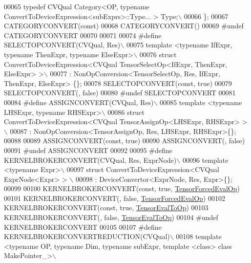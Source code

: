 \begin{DoxyCode}
00065 \textcolor{preprocessor}{  typedef CVQual Category<OP, typename ConvertToDeviceExpression<subExprs>::Type... > Type;\(\backslash\)}
00066 \textcolor{preprocessor}{\};}
00067 CATEGORYCONVERT(\textcolor{keyword}{const})
00068 CATEGORYCONVERT()
00069 \textcolor{preprocessor}{#undef CATEGORYCONVERT}
00070 
00071 
00074 \textcolor{preprocessor}{#define SELECTOPCONVERT(CVQual, Res)\(\backslash\)}
00075 \textcolor{preprocessor}{template <typename IfExpr, typename ThenExpr, typename ElseExpr>\(\backslash\)}
00076 \textcolor{preprocessor}{struct ConvertToDeviceExpression<CVQual TensorSelectOp<IfExpr, ThenExpr, ElseExpr> >\(\backslash\)}
00077 \textcolor{preprocessor}{: NonOpConversion<TensorSelectOp, Res, IfExpr, ThenExpr, ElseExpr> \{\};}
00078 SELECTOPCONVERT(\textcolor{keyword}{const}, \textcolor{keyword}{true})
00079 SELECTOPCONVERT(, \textcolor{keyword}{false})
00080 \textcolor{preprocessor}{#undef SELECTOPCONVERT}
00081 
00084 \textcolor{preprocessor}{#define ASSIGNCONVERT(CVQual, Res)\(\backslash\)}
00085 \textcolor{preprocessor}{template <typename LHSExpr, typename RHSExpr>\(\backslash\)}
00086 \textcolor{preprocessor}{struct ConvertToDeviceExpression<CVQual TensorAssignOp<LHSExpr, RHSExpr> >\(\backslash\)}
00087 \textcolor{preprocessor}{: NonOpConversion<TensorAssignOp, Res, LHSExpr, RHSExpr>\{\};}
00088 
00089 ASSIGNCONVERT(\textcolor{keyword}{const}, \textcolor{keyword}{true})
00090 ASSIGNCONVERT(, \textcolor{keyword}{false})
00091 \textcolor{preprocessor}{#undef ASSIGNCONVERT}
00092 
00095 \textcolor{preprocessor}{#define KERNELBROKERCONVERT(CVQual, Res, ExprNode)\(\backslash\)}
00096 \textcolor{preprocessor}{template <typename Expr>\(\backslash\)}
00097 \textcolor{preprocessor}{struct ConvertToDeviceExpression<CVQual ExprNode<Expr> > \(\backslash\)}
00098 \textcolor{preprocessor}{: DeviceConvertor<ExprNode, Res, Expr>\{\};}
00099 
00100 KERNELBROKERCONVERT(\textcolor{keyword}{const}, \textcolor{keyword}{true}, \hyperlink{class_eigen_1_1_tensor_forced_eval_op}{TensorForcedEvalOp})
00101 KERNELBROKERCONVERT(, \textcolor{keyword}{false}, \hyperlink{class_eigen_1_1_tensor_forced_eval_op}{TensorForcedEvalOp})
00102 KERNELBROKERCONVERT(\textcolor{keyword}{const}, \textcolor{keyword}{true}, \hyperlink{class_eigen_1_1_tensor_eval_to_op}{TensorEvalToOp})
00103 KERNELBROKERCONVERT(, \textcolor{keyword}{false}, \hyperlink{class_eigen_1_1_tensor_eval_to_op}{TensorEvalToOp})
00104 \textcolor{preprocessor}{#undef KERNELBROKERCONVERT}
00105 
00107 \textcolor{preprocessor}{#define KERNELBROKERCONVERTREDUCTION(CVQual)\(\backslash\)}
00108 \textcolor{preprocessor}{template <typename OP, typename Dim, typename subExpr, template <class> class MakePointer\_>\(\backslash\)}

\end{DoxyCode}
